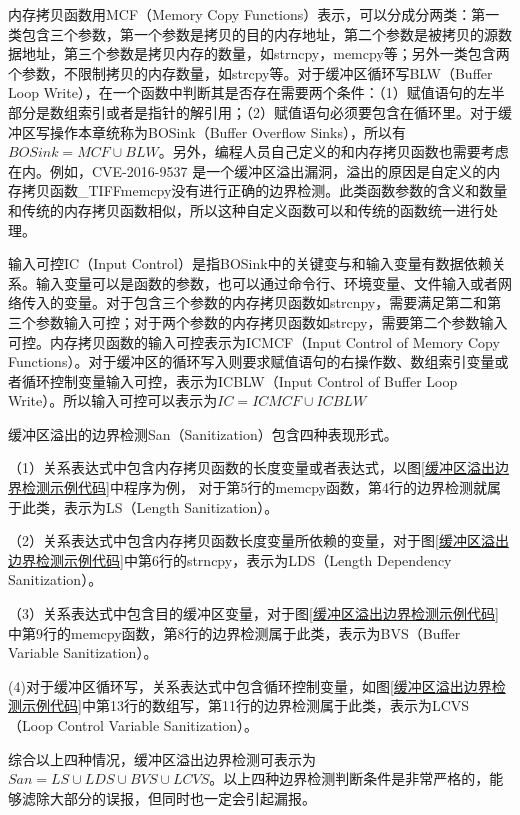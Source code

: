 {内存拷贝函数用MCF{（Memory Copy Functions）}表示，可以分成分两类：第一类包含三个参数，第一个参数是拷贝的目的内存地址，第二个参数是被拷贝的源数据地址，第三个参数是拷贝内存的数量，如strncpy，memcpy等；另外一类包含两个参数，不限制拷贝的内存数量，如strcpy等。对于缓冲区循环写BLW（Buffer Loop Write），在一个函数中判断其是否存在需要两个条件：（1）赋值语句的左半部分是数组索引或者是指针的解引用；（2）赋值语句必须要包含在循环里。对于缓冲区写操作本章统称为BOSink（Buffer Overflow Sinks），所以有$BOSink = MCF \cup BLW$。另外，编程人员自己定义的和内存拷贝函数也需要考虑在内。例如，CVE-2016-9537 是一个缓冲区溢出漏洞，溢出的原因是自定义的内存拷贝函数\_TIFFmemcpy没有进行正确的边界检测。此类函数参数的含义和数量和传统的内存拷贝函数相似，所以这种自定义函数可以和传统的函数统一进行处理。

输入可控IC（Input Control）是指BOSink中的关键变与和输入变量有数据依赖关系。输入变量可以是函数的参数，也可以通过命令行、环境变量、文件输入或者网络传入的变量。对于包含三个参数的内存拷贝函数如strcnpy，需要满足第二和第三个参数输入可控；对于两个参数的内存拷贝函数如strcpy，需要第二个参数输入可控。内存拷贝函数的输入可控表示为ICMCF（Input Control of Memory Copy Functions）。对于缓冲区的循环写入则要求赋值语句的右操作数、数组索引变量或者循环控制变量输入可控，表示为ICBLW（Input Control of Buffer Loop Write）。所以输入可控可以表示为$IC = ICMCF \cup ICBLW$

缓冲区溢出的边界检测San（Sanitization）包含四种表现形式。

（1）关系表达式中包含内存拷贝函数的长度变量或者表达式，以图\ref{缓冲区溢出边界检测示例代码}中程序为例，
对于第5行的memcpy函数，第4行的边界检测就属于此类，表示为LS（Length Sanitization）。

{（2）}关系表达式中包含内存拷贝函数长度变量所依赖的变量，对于图\ref{缓冲区溢出边界检测示例代码}中第6行的strncpy，表示为LDS（Length Dependency Sanitization）。

（3）关系表达式中包含目的缓冲区变量，对于图\ref{缓冲区溢出边界检测示例代码}中第9行的memcpy函数，第8行的边界检测属于此类，表示为BVS（Buffer Variable Sanitization）。

(4)对于缓冲区循环写，关系表达式中包含循环控制变量，如图\ref{缓冲区溢出边界检测示例代码}中第13行的数组写，第11行的边界检测属于此类，表示为LCVS（Loop Control Variable Sanitization）。

综合以上四种情况，缓冲区溢出边界检测可表示为$San = LS \cup LDS \cup BVS \cup LCVS$。以上四种边界检测判断条件是非常严格的，能够滤除大部分的误报，但同时也一定会引起漏报。

}
